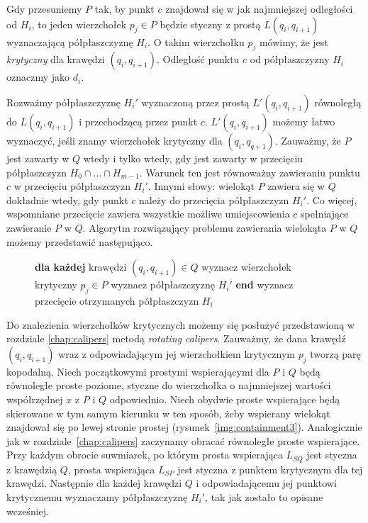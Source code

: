 Gdy przesuniemy $P$ tak, by punkt $c$ znajdował się w jak najmniejszej
odległości od $H_i$, to jeden wierzchołek $p_j \in P$ będzie styczny z
prostą $L(q_i, q_{i+1})$ wyznaczającą półpłaszczyznę $H_i$. O takim
wierzchołku $p_j$ mówimy, że jest \emph{krytyczny} dla krawędzi $(q_i,
q_{i+1})$. Odległość punktu $c$ od półpłaszczyzny $H_i$ oznaczmy jako
$d_i$.

Rozważmy półpłaszczyznę $H_i'$ wyznaczoną przez prostą
$L'(q_i,q_{i+1})$ równoległą do $L(q_i, q_{i+1})$ i przechodzącą przez
punkt $c$. $L'(q_i,q_{i+1})$ możemy łatwo wyznaczyć, jeśli znamy
wierzchołek krytyczny dla $(q_i, q_{q+1})$. Zauważmy, że $P$ jest
zawarty w $Q$ wtedy i tylko wtedy, gdy jest zawarty w przecięciu
półpłaszczyzn $H_0 \cap \ldots \cap H_{m-1}$. Warunek ten jest
równoważny zawieraniu punktu $c$ w przecięciu półpłaszczyzn
$H_i'$. Innymi słowy: wielokąt $P$ zawiera się w $Q$ dokładnie wtedy,
gdy punkt $c$ należy do przecięcia półpłaszczyzn $H_i'$. Co więcej,
wspomniane przecięcie zawiera wszystkie możliwe umiejscowienia $c$
spełniające zawieranie $P$ w $Q$. Algorytm rozwiązujący problemu
zawierania wielokąta $P$ w $Q$ możemy przedstawić następująco.

\begin{figure}[htp]
\begin{algorithmic}[1]

\State \textbf{dla każdej} krawędzi $(q_i, q_{i+1}) \in Q$
\State \hspace{\algorithmicindent} wyznacz wierzchołek krytyczny $p_j \in P$
\State \hspace{\algorithmicindent} wyznacz półpłaszczyznę $H_i'$
\State \textbf{end}
\State wyznacz przecięcie otrzymanych półpłaszczyzn $H_i$

\EndProcedure
\end{algorithmic}
\end{figure}

Do znalezienia wierzchołków krytycznych możemy się posłużyć
przedstawioną w rozdziale \ref{chap:calipers} metodą \emph{rotating
  calipers}. Zauważmy, że dana krawędź $(q_i, q_{i+1})$ wraz z
odpowiadającym jej wierzchołkiem krytycznym $p_j$ tworzą parę
kopodalną. Niech początkowymi prostymi wspierającymi dla $P$ i $Q$
będą równoległe proste poziome, styczne do wierzchołka o najmniejszej
wartości współrzędnej $x$ z $P$ i $Q$ odpowiednio. Niech obydwie
proste wspierające będą skierowane w tym samym kierunku w ten sposób,
żeby wspierany wielokąt znajdował się po lewej stronie prostej
(rysunek~\ref{img:containment3}). Analogicznie jak w
rozdziale~\ref{chap:calipers} zaczynamy obracać równoległe proste
wspierające. Przy każdym obrocie suwmiarek, po którym prosta
wspierająca $L_{SQ}$ jest styczna z krawędzią $Q$, prosta wspierająca
$L_{SP}$ jest styczna z punktem krytycznym dla tej krawędzi. Następnie
dla każdej krawędzi $Q$ i odpowiadającemu jej punktowi krytycznemu
wyznaczamy półpłaszczyznę $H_i'$, tak jak zostało to opisane
wcześniej.

